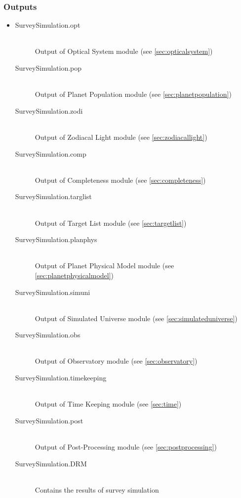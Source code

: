 \documentclass[cleanfoot]{asme2ej}
\begin{document}
\subsubsection*{Outputs}
\begin{itemize}
    \item
    \begin{description}
        \item[SurveySimulation.opt] \hfill \\
        Output of Optical System module (see \ref{sec:opticalsystem})
        \item[SurveySimulation.pop] \hfill \\
        Output of Planet Population module (see \ref{sec:planetpopulation})
        \item[SurveySimulation.zodi] \hfill \\
        Output of Zodiacal Light module (see \ref{sec:zodiacallight})
        \item[SurveySimulation.comp] \hfill \\
        Output of Completeness module (see \ref{sec:completeness})
        \item[SurveySimulation.targlist] \hfill \\
        Output of Target List module (see \ref{sec:targetlist})
        \item[SurveySimulation.planphys] \hfill \\
        Output of Planet Physical Model module (see \ref{sec:planetphysicalmodel})
        \item[SurveySimulation.simuni] \hfill \\
        Output of Simulated Universe module (see \ref{sec:simulateduniverse})
        \item[SurveySimulation.obs] \hfill \\
        Output of Observatory module (see \ref{sec:observatory})
        \item[SurveySimulation.timekeeping] \hfill \\
        Output of Time Keeping module (see \ref{sec:time})
        \item[SurveySimulation.post] \hfill \\
        Output of Post-Processing module (see \ref{sec:postprocessing})
        \item[SurveySimulation.DRM] \hfill \\
        Contains the results of survey simulation
    \end{description}
\end{itemize}
\end{document}
